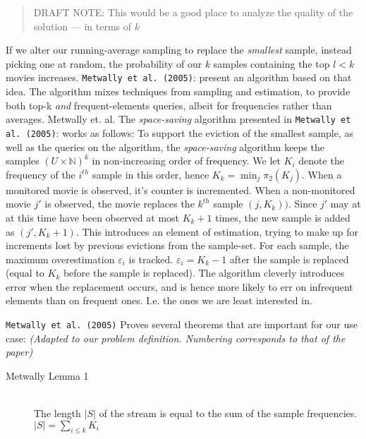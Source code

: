 {%
\begin{quote}
	DRAFT NOTE: This would be a good place to analyze the quality of the
	solution --- in terms of $k$
\end{quote}

If we alter our running-average sampling to replace the \textit{smallest}
sample, instead picking one at random, the probability of our $k$ samples
containing the top $l<k$ movies increases. \texttt{Metwally et al. (2005)}\citep{efficientstreams}: present an
algorithm based on that idea. The algorithm mixes techniques from sampling and
estimation, to provide both top-k \textit{and} frequent-elements queries, albeit
for frequencies rather than averages.
Metwally et. al.
The \textit{space-saving} algorithm presented in \texttt{Metwally et al. (2005)}\citep{efficientstreams}: works
as follows:
To support the eviction of the smallest sample, as well as the queries on the
algorithm, the \textit{space-saving} algorithm keeps the samples $(U\times
\mathbb{N})^k$ in non-increasing order of frequency. We let $K_i$ denote the
frequency of the $i^{th}$ sample in this order, hence $K_k = \min_j\pi_2(K_j)$.
When a monitored movie is observed, it's counter is incremented. When a
non-monitored movie $j'$ is observed, the movie replaces the $k^{th}$ sample
$(j,K_k))$. Since $j'$ may at at this time have
been observed at most $K_k+1$ times, the new sample is added as $(j',K_k+1)$. This
introduces an element of estimation, trying to make up for increments lost by
previous evictions from the sample-set. For each sample, the maximum
overestimation $\varepsilon_i$ is tracked. $\varepsilon_i = K_k-1$ after the
sample is replaced (equal to $K_k$ before the sample is replaced). The algorithm
cleverly introduces error when the replacement occurs, and is hence more likely
to err on infrequent elements than on frequent ones. I.e. the ones we are least
interested in.

\texttt{Metwally et al. (2005)}\citep{efficientstreams} Proves several theorems that are important for our use
case: \textit{(Adapted to our problem definition. Numbering corresponds to that
of the paper)}
\begin{description}
\item[Metwally Lemma 1] \hfill \\
	The length $|S|$ of the stream is equal to the sum of the sample
	frequencies.
	$|S| = \sum_{i\leq k}K_i$


\end{description}}
